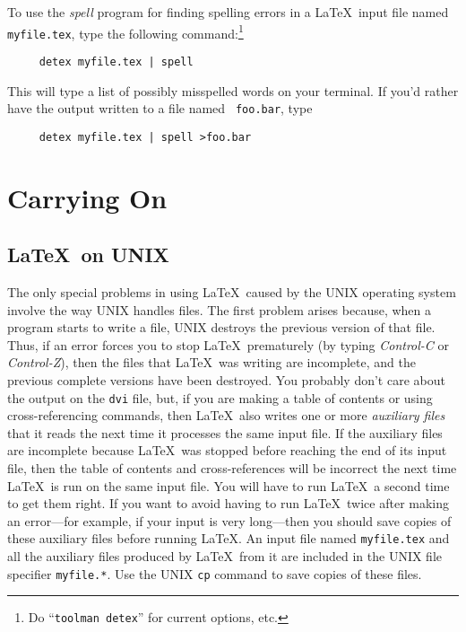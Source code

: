 To use the {\em spell\/} program for finding spelling errors in a
\LaTeX\ input file named \mbox{\tt myfile.tex}, type the following
command:\footnote{
Do ``{\tt toolman detex}'' for current options, etc.
}



\begin{verbatim}
     detex myfile.tex | spell
\end{verbatim}
This will type a list of possibly misspelled words on your terminal.
If you'd rather have the output written to a file named \mbox{\tt
foo.bar}, type
\begin{verbatim}
     detex myfile.tex | spell >foo.bar
\end{verbatim}


\section{Carrying On}

\subsection{\LaTeX\ on UNIX} \label{sec:op-system}

The only special problems in using \LaTeX\ caused by the UNIX
operating system involve the way UNIX handles files.  The first
problem arises because, when a program starts to write a file, UNIX
destroys the previous version of that file.  Thus, if an error forces
you to stop \LaTeX\ prematurely (by typing {\em Control-C\/} or {\em
Control-Z\/}), then the files that \LaTeX\ was writing are incomplete,
and the previous complete versions have been destroyed.  You probably
don't care about the output on the {\tt dvi} file, but, if you are
making a table of contents or using cross-referencing commands, then
\LaTeX\ also writes one or more {\em auxiliary files\/} that it reads
the next time it processes the same input file.  If the auxiliary files
are incomplete because \LaTeX\ was stopped before reaching the end of
its input file, then the table of contents and cross-references will be
incorrect the next time \LaTeX\ is run on the same input file.  You
will have to run \LaTeX\ a second time to get them right.  If you want
to avoid having to run \LaTeX\ twice after making an error---for
example, if your input is very long---then you should save copies of
these auxiliary files before running \LaTeX. An input file named
\mbox{\tt myfile.tex} and all the auxiliary files produced by \LaTeX\
from it are included in the UNIX file specifier \mbox{\tt myfile.*}.
Use the UNIX {\tt cp} command to save copies of these files.

